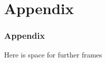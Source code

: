 \section{Appendix}
\begin{frame}
    \frametitle{Appendix}
    
    \Large Here is space for further frames

\end{frame}